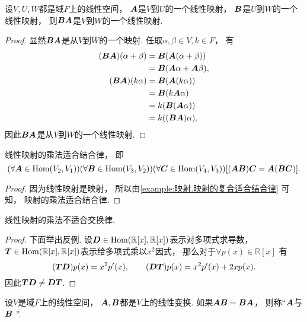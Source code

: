 \begin{proposition}
设\(V,U,W\)都是域\(F\)上的线性空间，
\(\boldsymbol{A}\)是\(V\)到\(U\)的一个线性映射，
\(\boldsymbol{B}\)是\(U\)到\(W\)的一个线性映射，
则\(\boldsymbol{B}\boldsymbol{A}\)是\(V\)到\(W\)的一个线性映射.
\begin{proof}
显然\(\boldsymbol{B}\boldsymbol{A}\)是从\(V\)到\(W\)的一个映射.
任取\(\alpha,\beta \in V,
k \in F\)，
有\begin{align*}
	(\boldsymbol{B}\boldsymbol{A})(\alpha+\beta)
	&= \boldsymbol{B}(\boldsymbol{A}(\alpha+\beta)) \\
	&= \boldsymbol{B}(\boldsymbol{A}\alpha+\boldsymbol{A}\beta), \\
	(\boldsymbol{B}\boldsymbol{A})(k\alpha)
	&= \boldsymbol{B}(\boldsymbol{A}(k \alpha)) \\
	&= \boldsymbol{B}(k \boldsymbol{A}\alpha) \\
	&= k(\boldsymbol{B}(\boldsymbol{A}\alpha)) \\
	&= k((\boldsymbol{B}\boldsymbol{A}) \alpha),
\end{align*}
因此\(\boldsymbol{B}\boldsymbol{A}\)是从\(V\)到\(W\)的一个线性映射.
\end{proof}
\end{proposition}

\begin{proposition}\label{theorem:线性映射.线性映射的乘法适合结合律}
线性映射的乘法适合结合律，
即\begin{equation*}
	(\forall\boldsymbol{A}\in\operatorname{Hom}(V_2,V_1))
	(\forall\boldsymbol{B}\in\operatorname{Hom}(V_3,V_2))
	(\forall\boldsymbol{C}\in\operatorname{Hom}(V_4,V_3))
	[
		(\boldsymbol{A}\boldsymbol{B})\boldsymbol{C}
		= \boldsymbol{A}(\boldsymbol{B}\boldsymbol{C})
	].
\end{equation*}
\begin{proof}
因为线性映射是映射，
所以由\cref{example:映射.映射的复合适合结合律} 可知，
映射的乘法适合结合律.
\end{proof}
\end{proposition}
\begin{proposition}\label{theorem:线性映射.线性映射的乘法不适合交换律}
线性映射的乘法不适合交换律.
\begin{proof}
下面举出反例.
\def\MyPolynomialRing{\mathbb{R}[x]}%
\def\MyLinearMapSpace{\Hom(\MyPolynomialRing,\MyPolynomialRing)}%
设\(\vb{D}\in\MyLinearMapSpace\)表示对多项式求导数，
\(\vb{T}\in\MyLinearMapSpace\)表示给多项式乘以\(x^2\)因式，
那么对于\(\forall p(x) \in \MyPolynomialRing\)
有\begin{equation*}
	(\boldsymbol{T}\boldsymbol{D})p(x)
	= x^2 p'(x),
	\qquad
	(\boldsymbol{D}\boldsymbol{T})p(x)
	= x^2 p'(x) + 2x p(x).
\end{equation*}
因此\(\boldsymbol{T}\boldsymbol{D} \neq \boldsymbol{D}\boldsymbol{T}\).
\end{proof}
\end{proposition}
\begin{definition}
设\(V\)是域\(F\)上的线性空间，
\(\boldsymbol{A},\boldsymbol{B}\)都是\(V\)上的线性变换.
如果\(\boldsymbol{A}\boldsymbol{B}=\boldsymbol{B}\boldsymbol{A}\)，
则称“\(\boldsymbol{A}\)与\(\boldsymbol{B}\) ”.
\end{definition}

